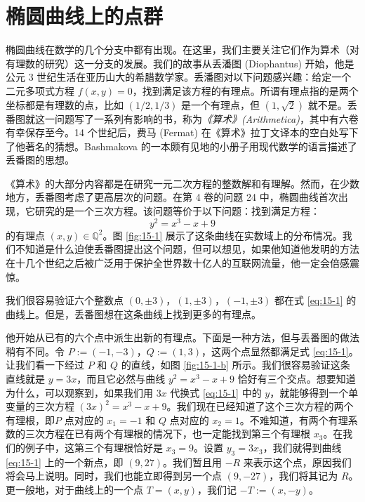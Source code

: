 \section{椭圆曲线上的点群}\label{sec:15-1}

椭圆曲线在数学的几个分支中都有出现。在这里，我们主要关注它们作为算术（对有理数的研究）这一分支的发展。我们的故事从丢潘图 (Diophantus) 开始，他是公元 3 世纪生活在亚历山大的希腊数学家。丢潘图对以下问题感兴趣：给定一个二元多项式方程 $f(x,y)=0$，找到满足该方程的有理点。所谓有理点指的是两个坐标都是有理数的点，比如 $({1}/{2},{1}/{3})$ 是一个有理点，但 $(1,\sqrt{2})$ 就不是。丢番图就这一问题写了一系列有影响的书，称为\emph{《算术》(Arithmetica)}，其中有六卷有幸保存至今。14 个世纪后，费马 (Fermat) 在《算术》拉丁文译本的空白处写下了他著名的猜想。Bashmakova 的一本颇有见地的小册子用现代数学的语言描述了丢番图的思想。

《算术》的大部分内容都是在研究一元二次方程的整数解和有理解。然而，在少数地方，丢番图考虑了更高层次的问题。在第 4 卷的问题 24 中，椭圆曲线首次出现，它研究的是一个三次方程。该问题等价于以下问题：找到满足方程：
\begin{equation}\label{eq:15-1}
y^2=x^3-x+9
\end{equation}
的有理点 $(x,y)\in\mathbb{Q}^2$。图 \ref{fig:15-1} 展示了这条曲线在实数域上的分布情况。我们不知道是什么迫使丢番图提出这个问题，但可以想见，如果他知道他发明的方法在十几个世纪之后被广泛用于保护全世界数十亿人的互联网流量，他一定会倍感震惊。

我们很容易验证六个整数点 $(0,\pm3)$，$(1,\pm3)$，$(-1,\pm3)$ 都在式 \ref{eq:15-1} 的曲线上。但是，丢番图想在这条曲线上找到更多的有理点。

他开始从已有的六个点中派生出新的有理点。下面是一种方法，但与丢番图的做法稍有不同。令 $P:=(-1,-3)$，$Q:=(1,3)$，这两个点显然都满足式 \ref{eq:15-1}。让我们看一下经过 $P$ 和 $Q$ 的直线，如图 \ref{fig:15-1-b} 所示。我们很容易验证这条直线就是 $y=3x$，而且它必然与曲线 $y^2=x^3-x+9$ 恰好有三个交点。想要知道为什么，可以观察到，如果我们用 $3x$ 代换式 \ref{eq:15-1} 中的 $y$，就能够得到一个单变量的三次方程 $(3x)^2=x^3-x+9$。我们现在已经知道了这个三次方程的两个有理根，即$P$ 点对应的 $x_1=-1$ 和 $Q$ 点对应的 $x_2=1$。不难知道，有两个有理系数的三次方程在已有两个有理根的情况下，也一定能找到第三个有理根 $x_3$。在我们的例子中，这第三个有理根恰好是 $x_3=9$。设置 $y_3=3x_3$，我们就得到曲线 \ref{eq:15-1} 上的一个新点，即 $(9,27)$。我们暂且用 $-R$ 来表示这个点，原因我们将会马上说明。同时，我们也能立即得到另一个点 $(9,-27)$，我们将其记为 $R$。更一般地，对于曲线上的一个点 $T=(x,y)$，我们记 $-T:=(x,-y)$。

